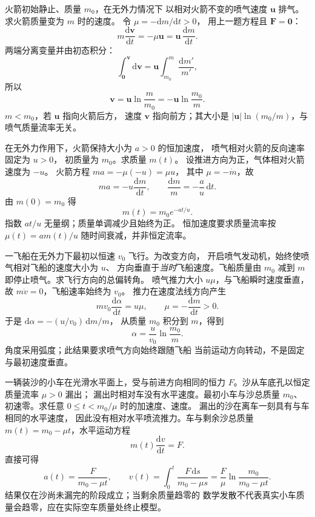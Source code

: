 火箭初始静止、质量 $m_0$，在无外力情况下
以相对火箭不变的喷气速度 $\bm u$ 排气。
求火箭质量变为 $m$ 时的速度。
\exsolution
令 $\mu=-\mathrm dm/\mathrm dt>0$，
用上一题方程且 $\bm F=\bm0$：
\[
m\frac{\mathrm d\bm v}{\mathrm dt}
=-\mu\bm u=\bm u\,\frac{\mathrm dm}{\mathrm dt}.
\]
两端分离变量并由初态积分：
\[
\int_{\bm0}^{\bm v}\mathrm d\bm v
=\bm u\int_{m_0}^{m}\frac{\mathrm dm'}{m'},
\]
所以
\[
\boxed{\bm v=\bm u\ln\frac m{m_0}
=-\bm u\ln\frac{m_0}{m}}.
\]
\excheck $m<m_0$，若 $\bm u$ 指向火箭后方，
速度 $\bm v$ 指向前方；其大小是
$|\bm u|\ln(m_0/m)$，与喷气质量流率无关。

在无外力作用下，火箭保持大小为 $a>0$ 的恒加速度，
喷气相对火箭的反向速率固定为 $u>0$，
初质量为 $m_0$。求质量 $m(t)$。
\exsolution
设推进方向为正，气体相对火箭速度为 $-u$。
火箭方程 $ma=-\mu(-u)=\mu u$，
其中 $\mu=-\dot m$，故
\[
ma=-u\frac{\mathrm dm}{\mathrm dt},
\qquad\frac{\mathrm dm}{m}=-\frac au\,\mathrm dt.
\]
由 $m(0)=m_0$ 得
\[
\boxed{m(t)=m_0e^{-at/u}}.
\]
\excheck 指数 $at/u$ 无量纲；质量单调减少且始终为正。
恒加速度要求质量流率按 $\mu(t)=am(t)/u$
随时间衰减，并非恒定流率。

一飞船在无外力下最初以恒速 $v_0$ 飞行。为改变方向，
开启喷气发动机，始终使喷气相对飞船的速度大小为 $u$、
方向垂直于\emph{当时}飞船速度。飞船质量由 $m_0$ 减到 $m$
即停止喷气。求飞行方向的总偏转角。
\exsolution
喷气推力大小 $u\mu$，与飞船瞬时速度垂直，
故 $m\dot v=0$，飞船速率始终为 $v_0$。
推力在速度法线方向产生
\[
m v_0\frac{\mathrm d\alpha}{\mathrm dt}=u\mu,
\qquad \mu=-\frac{\mathrm dm}{\mathrm dt}>0.
\]
于是 $\mathrm d\alpha=-(u/v_0)\,\mathrm dm/m$，
从质量 $m_0$ 积分到 $m$，得到
\[
\boxed{\alpha=\frac{u}{v_0}\ln\frac{m_0}{m}}.
\]
\excheck 角度采用弧度；此结果要求喷气方向始终跟随飞船
当前运动方向转动，不是固定与最初速度垂直。

一辆装沙的小车在光滑水平面上，受与前进方向相同的恒力
$F$。沙从车底孔以恒定质量流率 $\mu>0$ 漏出；
漏出时相对车没有水平速度。最初小车与沙总质量
$m_0$、初速零。求任意 $0\le t<m_0/\mu$ 时的加速度、速度。
\exsolution
漏出的沙在离车一刻具有与车相同的水平速度，
因此没有相对水平喷流推力。车与剩余沙总质量
$m(t)=m_0-\mu t$，水平运动方程
\[
m(t)\frac{\mathrm dv}{\mathrm dt}=F.
\]
直接可得
\[
\boxed{a(t)=\frac{F}{m_0-\mu t}},\qquad
\boxed{v(t)=\int_0^t\frac{F\,\mathrm ds}{m_0-\mu s}
=\frac F\mu\ln\frac{m_0}{m_0-\mu t}}.
\]
\excheck 结果仅在沙尚未漏完的阶段成立；当剩余质量趋零的
数学发散不代表真实小车质量会趋零，应在实际空车质量处终止模型。

